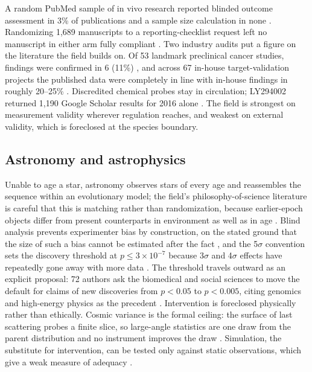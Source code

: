 \documentclass{article}
\begin{document}
A random PubMed sample of in vivo research reported blinded outcome assessment in 3\% of publications and a sample size calculation in none \citep{macleod2015risk}. Randomizing 1,689 manuscripts to a reporting-checklist request left no manuscript in either arm fully compliant \citep{hair2019randomised}. Two industry audits put a figure on the literature the field builds on. Of 53 landmark preclinical cancer studies, findings were confirmed in 6 (11\%) \citep{begley2012drug}, and across 67 in-house target-validation projects the published data were completely in line with in-house findings in roughly 20--25\% \citep{prinz2011believe}. Discredited chemical probes stay in circulation; LY294002 returned 1,190 Google Scholar results for 2016 alone \citep{blagg2017choose}. The field is strongest on measurement validity wherever regulation reaches, and weakest on external validity, which is foreclosed at the species boundary.

\subsection{Astronomy and astrophysics}

Unable to age a star, astronomy observes stars of every age and reassembles the sequence within an evolutionary model; the field's philosophy-of-science literature is careful that this is matching rather than randomization, because earlier-epoch objects differ from present counterparts in environment as well as in age \citep{anderl2016astronomy}. Blind analysis prevents experimenter bias by construction, on the stated ground that the size of such a bias cannot be estimated after the fact \citep{klein2005blind}, and the 5$\sigma$ convention sets the discovery threshold at $p \le 3 \times 10^{-7}$ because 3$\sigma$ and 4$\sigma$ effects have repeatedly gone away with more data \citep{lyons2013discovering}. The threshold travels outward as an explicit proposal: 72 authors ask the biomedical and social sciences to move the default for claims of new discoveries from $p < 0.05$ to $p < 0.005$, citing genomics and high-energy physics as the precedent \citep{benjamin2018redefine}. Intervention is foreclosed physically rather than ethically. Cosmic variance is the formal ceiling: the surface of last scattering probes a finite slice, so large-angle statistics are one draw from the parent distribution and no instrument improves the draw \citep{kamionkowski1997getting}. Simulation, the substitute for intervention, can be tested only against static observations, which give a weak measure of adequacy \citep{anderl2016astronomy}.
\end{document}
